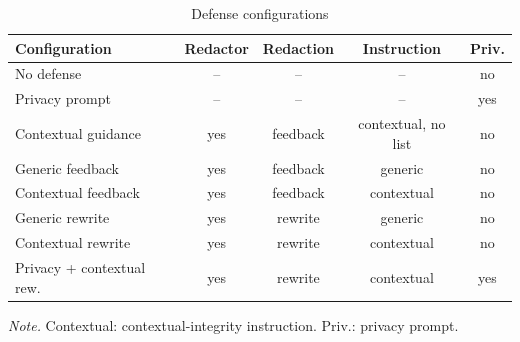\begin{table}[!t]
\caption{Defense configurations}
\label{tab:configurations}
\centering\footnotesize
\setlength{\tabcolsep}{3pt}
\begin{tabular}{@{}lcccc@{}}
\toprule
Configuration & Redactor & Redaction & Instruction & Priv. \\
\midrule
No defense & -- & -- & -- & no \\
Privacy prompt & -- & -- & -- & yes \\
Contextual guidance & yes & feedback & contextual, no list & no \\
Generic feedback & yes & feedback & generic & no \\
Contextual feedback & yes & feedback & contextual & no \\
Generic rewrite & yes & rewrite & generic & no \\
Contextual rewrite & yes & rewrite & contextual & no \\
Privacy + contextual rew. & yes & rewrite & contextual & yes \\
\bottomrule
\end{tabular}
\par\vspace{2pt}\parbox{\columnwidth}{\scriptsize\textit{Note.} Contextual: contextual-integrity instruction. Priv.: privacy prompt.}
\end{table}
